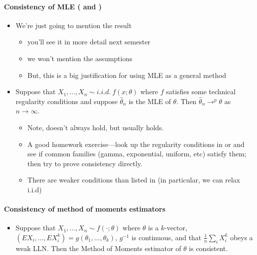 \paragraph{Consistency of MLE (\citealp[Theorem 10.1.6]{CaB_2001} and
  \citealp[Section 14.4]{Gre_2011})}
\begin{itemize}
\item We're just going to mention the result
\begin{itemize}
\item you'll see it in more detail next semester
\item we won't mention the assumptions
\item But, this is a big justification for using MLE as a general method
\end{itemize}
\item Suppose that $X_1,\dots,X_n \sim i.i.d.\ f(x; \theta)$ where
        $f$ satisfies some technical regularity conditions and suppose
        $\hat\theta_n$ is the MLE of $\theta$.  Then $\hat\theta_n
        \to^p \theta$ as $n \to \infty$.
\begin{itemize}
\item Note, doesn't always hold, but usually holds.
\item A good homework exercise---look up the regularity conditions
          in \citet{CaB_2001} or \citet{Gre_2011} and see if common families (gamma,
          exponential, uniform, etc) satisfy them; then try to prove consistency
          directly.
\item There are weaker conditions than listed in \citet{CaB_2001} (in particular,
          we can relax i.i.d)
\end{itemize}
\end{itemize}

\paragraph{Consistency of method of moments estimators}
\begin{itemize}
\item Suppose that $X_1,\dots,X_n \sim f(\cdot; \theta)$ where
        $\theta$ is a $k$-vector, $(E X_i,\dots,E X_i^k) =
        g(\theta_1,\dots,\theta_k)$, $g^{-1}$ is continuous, and that
        $\frac{1}{n} \sum_i X_i^k$ obeys a weak LLN.  Then the Method
        of Moments estimator of $\theta$ is consistent.
\end{itemize}

